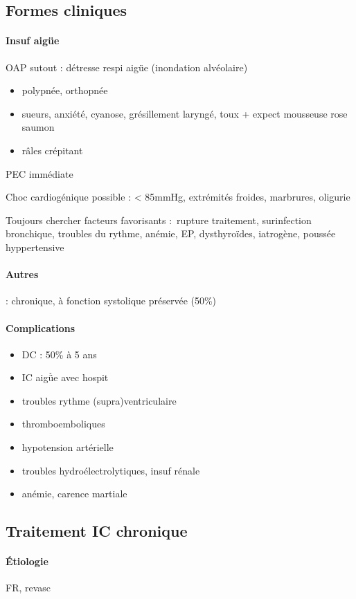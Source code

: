 \documentclass{article}
\begin{document}
\subsection{Formes cliniques}
\paragraph{ Insuf aigüe}
OAP sutout : détresse respi aigüe (inondation alvéolaire) 
\begin{itemize}
  \item polypnée, orthopnée
  \item sueurs, anxiété, cyanose, grésillement laryngé, toux + expect mousseuse
    rose saumon
  \item râles crépitant
\end{itemize}
\thus PEC immédiate \skull
   
Choc cardiogénique possible : < 85mmHg, extrémités froides, marbrures, oligurie

Toujours chercher facteurs favorisants : rupture traitement, surinfection
bronchique, troubles du rythme, anémie, EP, dysthyroïdes, iatrogène, poussée
hyppertensive

\paragraph{Autres} : chronique, à fonction systolique préservée (50\%)

\paragraph{Complications}
\begin{itemize}
  \item DC : 50\% à 5 ans
  \item IC aigǜe avec hospit
  \item troubles rythme (supra)ventriculaire
  \item thromboemboliques
  \item hypotension artérielle
  \item troubles hydroélectrolytiques, insuf rénale
  \item anémie, carence martiale
\end{itemize}

\subsection{Traitement IC chronique}
\paragraph{Étiologie}
FR, revasc
\end{document}
